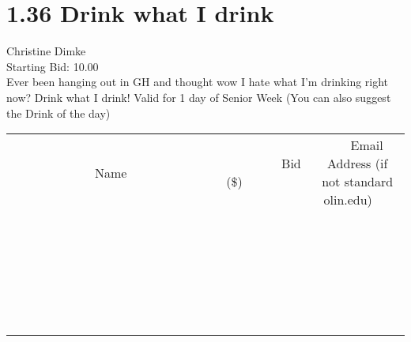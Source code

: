 \documentclass[11pt]{article}
\begin{document}
					\section*{1.36 Drink what I drink}
					Christine Dimke \\
					Starting Bid: 10.00 \\
					Ever been hanging out in GH and thought wow I hate what I'm drinking right now?  Drink what I drink!  Valid for 1 day of Senior Week (You can also suggest the Drink of the day) \\
					[6ex]
					\begin{tabular}{c c c}
						~~~~~~~~~~~~~Name~~~~~~~~~~~~~ & ~~~~~~~~~Bid (\$)~~~~~~~~~ & ~~~Email Address (if not standard olin.edu)~~~ \\
				
 & & \\
\hline
 & & \\
\hline
 & & \\
\hline
 & & \\
\hline
 & & \\
\hline
 & & \\
\hline
 & & \\
\hline
 & & \\
\hline
 & & \\
\hline
 & & \\
\hline
 & & \\
\hline
 & & \\
\hline
 & & \\
\hline
 & & \\
\hline
 & & \\
\hline
 & & \\
\hline
 & & \\
\hline
 & & \\
\hline
 & & \\
\hline
 & & \\
\hline
 & & \\
\hline
 & & \\
\hline
 & & \\
\hline
 & & \\
\hline
 & & \\
\hline
 & & \\
\hline
					\end{tabular}
					\clearpage
				
\end{document}
